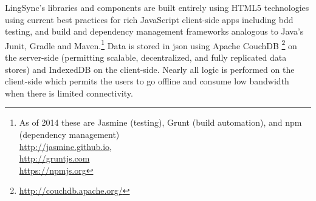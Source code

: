 \documentclass[11pt]{article}
\newcommand{\smalltodo}[2][]
    {\todo[caption={#2}, #1]
    {\tiny#2\normalsize}}
\begin{document}
LingSync's libraries and components are built entirely using HTML5 technologies
using current best practices for rich JavaScript client-side apps including
\gls{bdd} testing, and build and dependency management frameworks analogous to
Java's Junit, Gradle and Maven.\footnote{As of 2014 these are Jasmine (testing), Grunt (build automation), and \gls{npm} (dependency management)\\
\url{http://jasmine.github.io}, \\
\url{http://gruntjs.com} \\
\url{https://npmjs.org}}
Data is stored in \gls{json} using Apache CouchDB%
\footnote{\url{http://couchdb.apache.org/}} %
on the server-side (permitting scalable, decentralized, and fully replicated data
stores) and IndexedDB on the client-side. Nearly all logic is performed on the
client-side which permits the users to go offline and consume low bandwidth
when there is limited connectivity.

\end{document}
